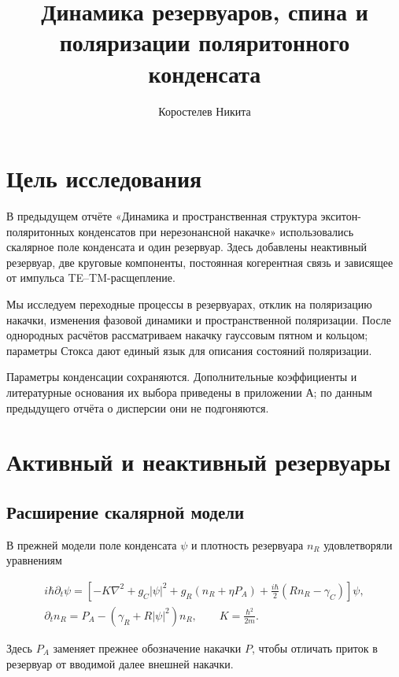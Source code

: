 \documentclass[12pt,a4paper]{article}
\title{Динамика резервуаров, спина и поляризации поляритонного конденсата}
\author{Коростелев Никита}
\date{}
\begin{document}
\maketitle
\clearpage



\section*{Цель исследования}

В предыдущем отчёте «Динамика и пространственная структура экситон-поляритонных конденсатов при нерезонансной накачке» использовались скалярное поле конденсата и один резервуар. Здесь добавлены неактивный резервуар, две круговые компоненты, постоянная когерентная связь и зависящее от импульса TE--TM-расщепление.

Мы исследуем переходные процессы в резервуарах, отклик на поляризацию накачки, изменения фазовой динамики и пространственной поляризации. После однородных расчётов рассматриваем накачку гауссовым пятном и кольцом; параметры Стокса дают единый язык для описания состояний поляризации.

Параметры конденсации сохраняются. Дополнительные коэффициенты и литературные основания их выбора приведены в приложении А; по данным предыдущего отчёта о дисперсии они не подгоняются.

\section{Активный и неактивный резервуары}

\subsection{Расширение скалярной модели}

В прежней модели поле конденсата \(\psi\) и плотность резервуара \(n_R\) удовлетворяли уравнениям

\[
\begin{gathered}
i\hbar\partial_t\psi=
\left[-K\nabla^2+g_C|\psi|^2+g_R(n_R+\eta P_A)
+\frac{i\hbar}{2}(Rn_R-\gamma_C)\right]\psi,
\\
\partial_t n_R=P_A-(\gamma_R+R|\psi|^2)n_R,
\qquad K=\frac{\hbar^2}{2m}.
\end{gathered}
\tag{1}\label{eq:1}
\]

Здесь \(P_A\) заменяет прежнее обозначение накачки \(P\), чтобы отличать приток в резервуар от вводимой далее внешней накачки.
\end{document}
